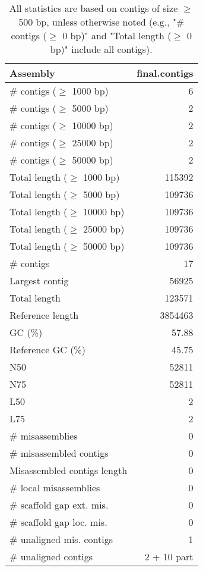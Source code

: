 \documentclass[12pt,a4paper]{article}
\begin{document}
\begin{table}[ht]
\begin{center}
\caption{All statistics are based on contigs of size $\geq$ 500 bp, unless otherwise noted (e.g., "\# contigs ($\geq$ 0 bp)" and "Total length ($\geq$ 0 bp)" include all contigs).}
\begin{tabular}{|l*{1}{|r}|}
\hline
Assembly & final.contigs \\ \hline
\# contigs ($\geq$ 1000 bp) & 6 \\ \hline
\# contigs ($\geq$ 5000 bp) & 2 \\ \hline
\# contigs ($\geq$ 10000 bp) & 2 \\ \hline
\# contigs ($\geq$ 25000 bp) & 2 \\ \hline
\# contigs ($\geq$ 50000 bp) & 2 \\ \hline
Total length ($\geq$ 1000 bp) & 115392 \\ \hline
Total length ($\geq$ 5000 bp) & 109736 \\ \hline
Total length ($\geq$ 10000 bp) & 109736 \\ \hline
Total length ($\geq$ 25000 bp) & 109736 \\ \hline
Total length ($\geq$ 50000 bp) & 109736 \\ \hline
\# contigs & 17 \\ \hline
Largest contig & 56925 \\ \hline
Total length & 123571 \\ \hline
Reference length & 3854463 \\ \hline
GC (\%) & 57.88 \\ \hline
Reference GC (\%) & 45.75 \\ \hline
N50 & 52811 \\ \hline
N75 & 52811 \\ \hline
L50 & 2 \\ \hline
L75 & 2 \\ \hline
\# misassemblies & 0 \\ \hline
\# misassembled contigs & 0 \\ \hline
Misassembled contigs length & 0 \\ \hline
\# local misassemblies & 0 \\ \hline
\# scaffold gap ext. mis. & 0 \\ \hline
\# scaffold gap loc. mis. & 0 \\ \hline
\# unaligned mis. contigs & 1 \\ \hline
\# unaligned contigs & 2 + 10 part \\ \hline

\end{tabular}
\end{center}
\end{table}
\end{document}
